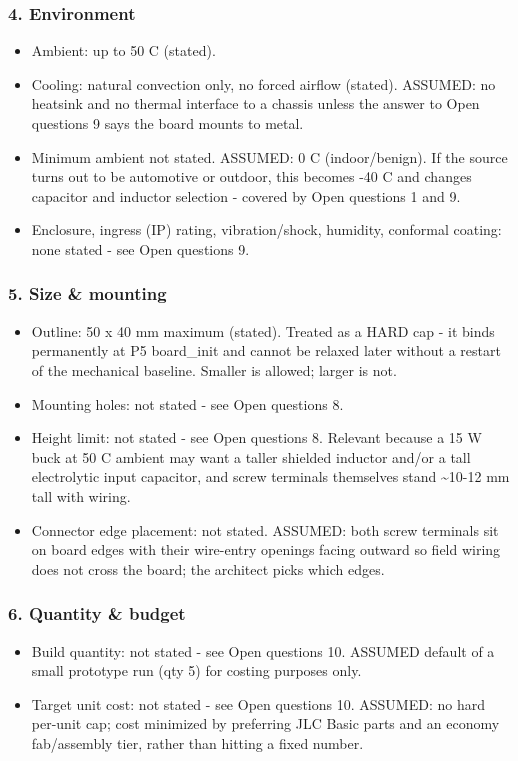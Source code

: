\documentclass[11pt,a4paper]{article}
\begin{document}
\subsubsection*{4. Environment}
\begin{itemize}
\item Ambient: up to 50 C (stated).
\item Cooling: natural convection only, no forced airflow (stated). ASSUMED:
no heatsink and no thermal interface to a chassis unless the answer to
Open questions 9 says the board mounts to metal.
\item Minimum ambient not stated. ASSUMED: 0 C (indoor/benign). If the source
turns out to be automotive or outdoor, this becomes -40 C and changes
capacitor and inductor selection - covered by Open questions 1 and 9.
\item Enclosure, ingress (IP) rating, vibration/shock, humidity, conformal
coating: none stated - see Open questions 9.
\end{itemize}
\subsubsection*{5. Size \& mounting}
\begin{itemize}
\item Outline: 50 x 40 mm maximum (stated). Treated as a HARD cap - it binds
permanently at P5 board\_init and cannot be relaxed later without a
restart of the mechanical baseline. Smaller is allowed; larger is not.
\item Mounting holes: not stated - see Open questions 8.
\item Height limit: not stated - see Open questions 8. Relevant because a
15 W buck at 50 C ambient may want a taller shielded inductor and/or a
tall electrolytic input capacitor, and screw terminals themselves stand
\textasciitilde{}10-12 mm tall with wiring.
\item Connector edge placement: not stated. ASSUMED: both screw terminals sit
on board edges with their wire-entry openings facing outward so field
wiring does not cross the board; the architect picks which edges.
\end{itemize}
\subsubsection*{6. Quantity \& budget}
\begin{itemize}
\item Build quantity: not stated - see Open questions 10. ASSUMED default of
a small prototype run (qty 5) for costing purposes only.
\item Target unit cost: not stated - see Open questions 10. ASSUMED: no hard
per-unit cap; cost minimized by preferring JLC Basic parts and an
economy fab/assembly tier, rather than hitting a fixed number.
\end{itemize}
\end{document}
